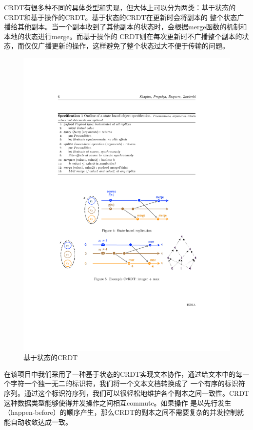 \documentclass[11pt]{ctexart}
\begin{document}
CRDT有很多种不同的具体类型和实现，但大体上可以分为两类：基于状态的CRDT和基于操作的CRDT。基于状态的CRDT在更新时会将副本的
整个状态广播给其他副本。当一个副本收到了其他副本的状态时，会根据merge函数的机制和本地的状态进行merge。而基于操作的
CRDT则在每次更新时不广播整个副本的状态，而仅仅广播更新的操作，这样避免了整个状态过大不便于传输的问题。
\begin{figure}[ht]
    \begin{center}
    \includegraphics[width=\textwidth]{figures/state_crdt.pdf}
    \caption{基于状态的CRDT}
    \end{center}
\end{figure}

在该项目中我们采用了一种基于状态的CRDT实现文本协作，通过给文本中的每一个字符一个独一无二的标识符，我们将一个文本文档转换成了
一个有序的标识符序列。通过这个标识符序列，我们可以很轻松地维护各个副本之间一致性。CRDT这种数据类型能够使得并发操作之间相互commute。如果操作
是以先行发生（happen-before）的顺序产生，那么CRDT的副本之间不需要复杂的并发控制就能自动收敛达成一致。
\end{document}
